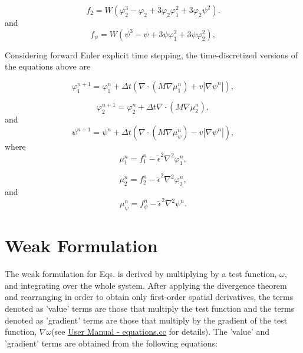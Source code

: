 \documentclass[11pt]{article}
\begin{document}
\begin{equation} \label{f_2}
f_2=W\left(\varphi_{2}^3-\varphi_{2}+3\varphi_{2}\varphi_{1}^2+3\varphi_{2}\psi^2\right).
\end{equation}
and
\begin{equation} \label{f_psi}
f_{\psi}= W\left(\psi^3-\psi+3\psi\varphi_{1}^2+3\psi\varphi_{2}^2\right),
\end{equation}

Considering forward Euler explicit time stepping, the time-discretized versions of the equations above are

\begin{equation} \label{phi1_np1}
\varphi^{n+1}_1 = \varphi^n_1+\Delta t \left(\nabla\cdot \left(M\nabla\mu^n_1\right)+v|\nabla \psi^n|\right),
\end{equation}

\begin{equation} \label{phi2_np1}
\varphi^{n+1}_2 = \varphi^n_2+\Delta t \nabla\cdot \left(M\nabla\mu^n_2\right),
\end{equation}
and
\begin{equation} \label{psi_np1}
\psi^{n+1} = \psi^n+\Delta t \left(\nabla\cdot\left(M\nabla\mu^n_{\psi}\right)-v|\nabla\psi^n|\right),
\end{equation}
where
\begin{equation} \label{mu1_n}
\mu^n_1=f^n_1-\widetilde{\epsilon}^2\nabla^2\varphi^n_1,
\end{equation}

\begin{equation} \label{mu2_n}
\mu^n_2=f^n_2-\widetilde{\epsilon}^2\nabla^2\varphi^n_2,
\end{equation}
and
\begin{equation} \label{mu_psi_n}
\mu^n_{\psi}=f^n_{\psi}-\widetilde{\epsilon}^2\nabla^2\psi^n.
\end{equation}


\bigskip
\section{Weak Formulation}

The weak formulation for Eqs.  is derived by multiplying by a test function, $\omega$, and integrating over the whole system. After applying the divergence theorem and rearranging in order to obtain only first-order spatial derivatives, the terms denoted as 'value' terms are those that multiply the test function and the terms denoted as 'gradient' terms are those that multiply by the gradient of the test function, $\nabla \omega$(see \href{https://prisms-center.github.io/phaseField/doxygen_files/app_files.html}{User Manual - equations.cc} for details). The 'value' and 'gradient' terms are obtained from the following equations:
\end{document}
